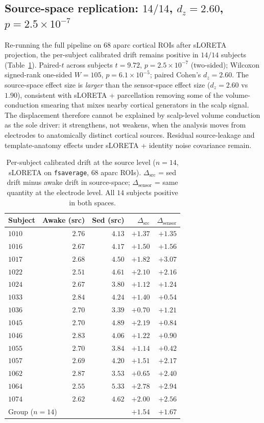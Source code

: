 \documentclass[11pt,a4paper]{article}
\begin{document}
\subsection{Source-space replication: $14/14$, $d_z=2.60$, $p=2.5\!\times\!10^{-7}$}\label{sec:source-results}

Re-running the full pipeline on $68$ aparc cortical ROIs after sLORETA projection, the per-subject calibrated drift remains positive in $14/14$ subjects (Table~\ref{tab:source-drift}). Paired-$t$ across subjects $t=9.72$, $p=2.5\!\times\!10^{-7}$ (two-sided); Wilcoxon signed-rank one-sided $W=105$, $p=6.1\!\times\!10^{-5}$; paired Cohen's $d_z=2.60$. The source-space effect size is \emph{larger} than the sensor-space effect size ($d_z=2.60$ vs $1.90$), consistent with sLORETA + parcellation removing some of the volume-conduction smearing that mixes nearby cortical generators in the scalp signal. The displacement therefore cannot be explained by scalp-level volume conduction as the sole driver: it strengthens, not weakens, when the analysis moves from electrodes to anatomically distinct cortical sources. Residual source-leakage and template-anatomy effects under sLORETA + identity noise covariance remain.

\begin{table}[h]
\centering\small
\caption{Per-subject calibrated drift at the source level ($n=14$, sLORETA on \texttt{fsaverage}, $68$ aparc ROIs). $\Delta_{\text{src}}$ = sed drift minus awake drift in source-space; $\Delta_{\text{sensor}}$ = same quantity at the electrode level. All $14$ subjects positive in both spaces.}\label{tab:source-drift}
\begin{tabular}{lrrrr}\toprule
Subject & Awake (src) & Sed (src) & $\Delta_{\text{src}}$ & $\Delta_{\text{sensor}}$ \\
\midrule
$1010$ & $2.76$ & $4.13$ & $+1.37$ & $+1.35$ \\
$1016$ & $2.67$ & $4.17$ & $+1.50$ & $+1.56$ \\
$1017$ & $2.68$ & $4.50$ & $+1.82$ & $+3.07$ \\
$1022$ & $2.51$ & $4.61$ & $+2.10$ & $+2.16$ \\
$1024$ & $2.67$ & $3.80$ & $+1.12$ & $+1.24$ \\
$1033$ & $2.84$ & $4.24$ & $+1.40$ & $+0.54$ \\
$1036$ & $2.70$ & $3.39$ & $+0.70$ & $+1.21$ \\
$1045$ & $2.70$ & $4.89$ & $+2.19$ & $+0.84$ \\
$1046$ & $2.83$ & $4.06$ & $+1.22$ & $+0.90$ \\
$1055$ & $2.70$ & $3.84$ & $+1.14$ & $+0.42$ \\
$1057$ & $2.69$ & $4.20$ & $+1.51$ & $+2.17$ \\
$1062$ & $2.87$ & $3.53$ & $+0.65$ & $+2.40$ \\
$1064$ & $2.55$ & $5.33$ & $+2.78$ & $+2.94$ \\
$1074$ & $2.62$ & $4.62$ & $+2.00$ & $+2.56$ \\
\midrule
\multicolumn{3}{l}{Group ($n=14$)} & $+1.54$ & $+1.67$ \\
\bottomrule\end{tabular}
\end{table}
\end{document}
